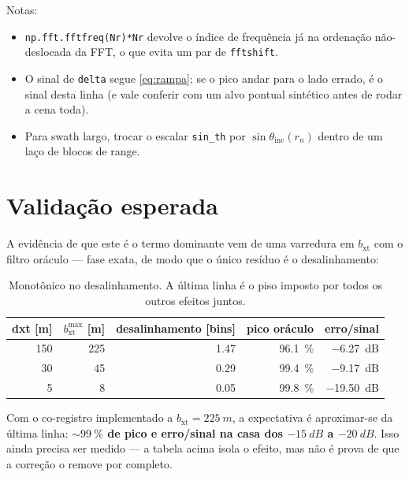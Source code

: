 \documentclass[11pt,a4paper]{article}
\newcommand{\bxt}{b_{\mathrm{xt}}}
\newcommand{\thi}{\theta_{\mathrm{inc}}}
\begin{document}
\noindent
Notas:
\begin{itemize}
\item \texttt{np.fft.fftfreq(Nr)*Nr} devolve o índice de frequência já na
ordenação não-deslocada da FFT, o que evita um par de \texttt{fftshift}.
\item O sinal de \texttt{delta} segue \eqref{eq:rampa}; se o pico andar para
o lado errado, é o sinal desta linha (e vale conferir com um alvo pontual
sintético antes de rodar a cena toda).
\item Para swath largo, trocar o escalar \texttt{sin\_th} por
$\sin\thi(r_n)$ dentro de um laço de blocos de range.
\end{itemize}

\section{Validação esperada}

A evidência de que este é o termo dominante vem de uma varredura em $\bxt$
com o filtro oráculo --- fase exata, de modo que o único resíduo é o
desalinhamento:

\begin{table}[h]
\centering
\begin{tabular}{rrrrr}
\toprule
dxt [m] & $\bxt^{\max}$ [m] & desalinhamento [bins] & pico oráculo & erro/sinal \\
\midrule
\num{150} & \num{225} & \num{1.47} & \SI{96.1}{\percent} & \SI{-6.27}{dB} \\
\num{30}  & \num{45}  & \num{0.29} & \SI{99.4}{\percent} & \SI{-9.17}{dB} \\
\num{5}   & \num{8}   & \num{0.05} & \SI{99.8}{\percent} & \SI{-19.50}{dB} \\
\bottomrule
\end{tabular}
\caption{Monotônico no desalinhamento. A última linha é o piso imposto por
todos os outros efeitos juntos.}
\label{tab:sweep}
\end{table}

\noindent
Com o co-registro implementado a $\bxt = \SI{225}{m}$, a expectativa é
aproximar-se da última linha: \textbf{$\sim\SI{99}{\percent}$ de pico e
erro/sinal na casa dos $\SI{-15}{dB}$ a $\SI{-20}{dB}$}. Isso ainda precisa
ser medido --- a tabela acima isola o efeito, mas não é prova de que a
correção o remove por completo.
\end{document}
